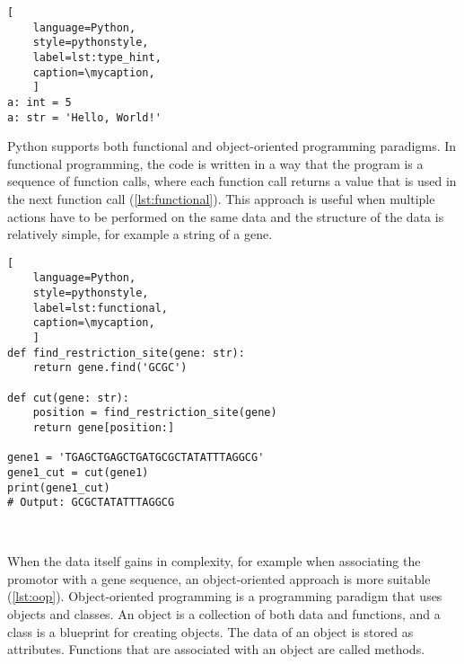 \def\mycaption{
    Example of type hints used in python. Explicitly stating the type of the
    variable is optional and does not change the behavior of the code as shown in
    \autoref{lst:dynamic_typing}.}
\begin{lstlisting}[
    language=Python,
    style=pythonstyle,
    label=lst:type_hint,
    caption=\mycaption,
    ]
a: int = 5
a: str = 'Hello, World!'
\end{lstlisting}


Python supports both functional and object-oriented programming paradigms. In
functional programming, the code is written in a way that the program is a
sequence of function calls, where each function call returns a value that is
used in the next function call (\autoref{lst:functional}). This approach is
useful when multiple actions have to be performed on the same data and the
structure of the data is relatively simple, for example a string of a gene.

\def\mycaption{ Example of functional programming in Python. The code
    defines a function called ``\texttt{find\_restriction\_site}'' that
    finds the position of a restriction site in a gene. The function
    ``\texttt{cut}'' uses the function ``\texttt{find\_restriction\_site}''
    to cut the gene at the restriction site.}
\begin{lstlisting}[
    language=Python,
    style=pythonstyle,
    label=lst:functional,
    caption=\mycaption,
    ]
def find_restriction_site(gene: str):
    return gene.find('GCGC')
    
def cut(gene: str):
    position = find_restriction_site(gene)
    return gene[position:]   
    
gene1 = 'TGAGCTGAGCTGATGCGCTATATTTAGGCG'
gene1_cut = cut(gene1)
print(gene1_cut)
# Output: GCGCTATATTTAGGCG
    
    
\end{lstlisting}


When the data itself gains in complexity, for example when associating the
promotor with a gene sequence, an object-oriented approach is more suitable
(\autoref{lst:oop}). Object-oriented programming is a programming paradigm that
uses objects and classes. An object is a collection of both data and functions,
and a class is a blueprint for creating objects. The data of an object is stored
as attributes. Functions that are associated with an object are called methods.


